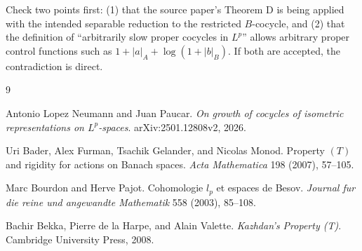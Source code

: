 \documentclass[11pt]{article}
\begin{document}
Check two points first: (1) that the source paper's Theorem D is being applied
with the intended separable reduction to the restricted \(B\)-cocycle, and
(2) that the definition of ``arbitrarily slow proper cocycles in \(L^p\)''
allows arbitrary proper control functions such as
\(1+|a|_A+\log(1+|b|_B)\). If both are accepted, the contradiction is direct.

\begin{thebibliography}{9}

Antonio Lopez Neumann and Juan Paucar.
\newblock \emph{On growth of cocycles of isometric representations on
\(L^p\)-spaces}.
\newblock arXiv:2501.12808v2, 2026.

Uri Bader, Alex Furman, Tsachik Gelander, and Nicolas Monod.
\newblock Property \((T)\) and rigidity for actions on Banach spaces.
\newblock \emph{Acta Mathematica} 198 (2007), 57--105.

Marc Bourdon and Herve Pajot.
\newblock Cohomologie \(l_p\) et espaces de Besov.
\newblock \emph{Journal fur die reine und angewandte Mathematik} 558
(2003), 85--108.

Bachir Bekka, Pierre de la Harpe, and Alain Valette.
\newblock \emph{Kazhdan's Property (T)}.
\newblock Cambridge University Press, 2008.

\end{thebibliography}
\end{document}
